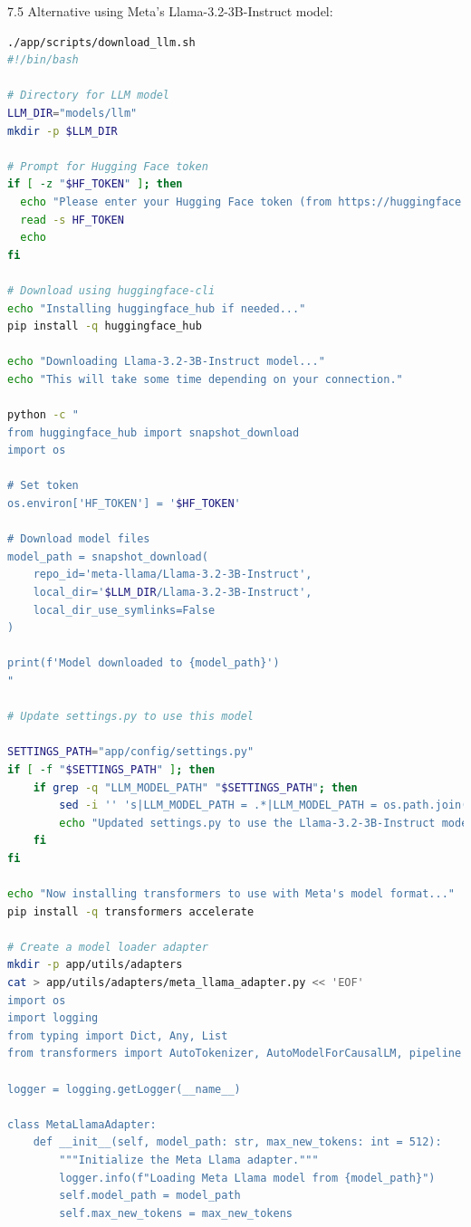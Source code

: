 \documentclass[
  screen,review,acmlarge]{acmart}
\begin{document}
7.5 Alternative using Meta's Llama-3.2-3B-Instruct model:

\begin{lstlisting}[language=bash]
./app/scripts/download_llm.sh
#!/bin/bash

# Directory for LLM model
LLM_DIR="models/llm"
mkdir -p $LLM_DIR

# Prompt for Hugging Face token
if [ -z "$HF_TOKEN" ]; then
  echo "Please enter your Hugging Face token (from https://huggingface.co/settings/tokens):"
  read -s HF_TOKEN
  echo
fi

# Download using huggingface-cli
echo "Installing huggingface_hub if needed..."
pip install -q huggingface_hub

echo "Downloading Llama-3.2-3B-Instruct model..."
echo "This will take some time depending on your connection."

python -c "
from huggingface_hub import snapshot_download
import os

# Set token
os.environ['HF_TOKEN'] = '$HF_TOKEN'

# Download model files
model_path = snapshot_download(
    repo_id='meta-llama/Llama-3.2-3B-Instruct',
    local_dir='$LLM_DIR/Llama-3.2-3B-Instruct',
    local_dir_use_symlinks=False
)

print(f'Model downloaded to {model_path}')
"

# Update settings.py to use this model

SETTINGS_PATH="app/config/settings.py"
if [ -f "$SETTINGS_PATH" ]; then
    if grep -q "LLM_MODEL_PATH" "$SETTINGS_PATH"; then
        sed -i '' 's|LLM_MODEL_PATH = .*|LLM_MODEL_PATH = os.path.join(BASE_DIR, "models", "llm", "Llama-3.2-3B-Instruct")|' "$SETTINGS_PATH"
        echo "Updated settings.py to use the Llama-3.2-3B-Instruct model."
    fi
fi

echo "Now installing transformers to use with Meta's model format..."
pip install -q transformers accelerate

# Create a model loader adapter
mkdir -p app/utils/adapters
cat > app/utils/adapters/meta_llama_adapter.py << 'EOF'
import os
import logging
from typing import Dict, Any, List
from transformers import AutoTokenizer, AutoModelForCausalLM, pipeline

logger = logging.getLogger(__name__)

class MetaLlamaAdapter:
    def __init__(self, model_path: str, max_new_tokens: int = 512):
        """Initialize the Meta Llama adapter."""
        logger.info(f"Loading Meta Llama model from {model_path}")
        self.model_path = model_path
        self.max_new_tokens = max_new_tokens
        

\end{lstlisting}
\end{document}
